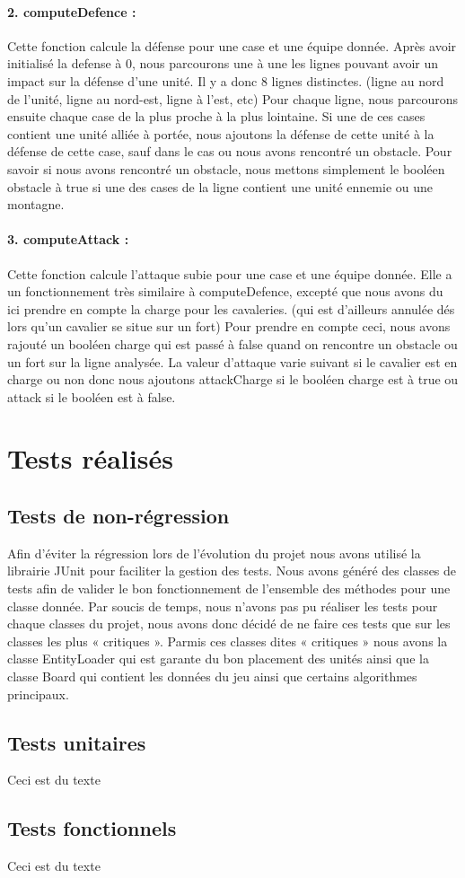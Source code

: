 			\paragraph{2. computeDefence : }
			Cette fonction calcule la défense pour une case et une équipe donnée.
			Après avoir initialisé la defense à 0, nous parcourons une à une les lignes pouvant avoir un impact sur la défense d'une unité.
			Il y a donc 8 lignes distinctes. (ligne au nord de l'unité, ligne au nord-est, ligne à l'est, etc)
			Pour chaque ligne, nous parcourons ensuite chaque case de la plus proche à la plus lointaine.
			Si une de ces cases contient une unité alliée à portée, nous ajoutons la défense de cette unité à la défense de cette case, 
			sauf dans le cas ou nous avons rencontré un obstacle.
			Pour savoir si nous avons rencontré un obstacle, nous mettons simplement le booléen obstacle à true si une des cases de la 
			ligne contient une unité ennemie ou une montagne.
			
			\paragraph{3. computeAttack : }
			Cette fonction calcule l'attaque subie pour une case et une équipe donnée.
			Elle a un fonctionnement très similaire à computeDefence, excepté que nous avons du ici prendre en compte la charge pour les cavaleries. 
			(qui est d'ailleurs annulée dés lors qu'un cavalier se situe sur un fort)
			Pour prendre en compte ceci, nous avons rajouté un booléen charge qui est passé à false quand on rencontre un obstacle 
			ou un fort sur la ligne analysée.
			La valeur d'attaque varie suivant si le cavalier est en charge ou non donc nous ajoutons attackCharge si le booléen charge est 
			à true ou attack si le booléen est à false.
			
		\clearpage
	 

	\section{Tests réalisés}

		\subsection{Tests de non-régression}
		
		Afin d'éviter la régression lors de l'évolution du projet nous avons utilisé la librairie JUnit pour faciliter la gestion des tests. 
		Nous avons généré des classes de tests afin de valider le bon fonctionnement de l'ensemble des méthodes pour une classe donnée.
		Par soucis de temps, nous n'avons pas pu réaliser les tests pour chaque classes du projet, nous avons donc décidé de ne faire ces tests que sur les classes les plus « critiques ».
		Parmis ces classes dites « critiques » nous avons la classe EntityLoader qui est garante du bon placement des unités ainsi que la classe Board qui contient les données du jeu
		ainsi que certains algorithmes principaux.
		
		\subsection{Tests unitaires}
		
		Ceci est du texte
		
		\subsection{Tests fonctionnels}
		
		Ceci est du texte